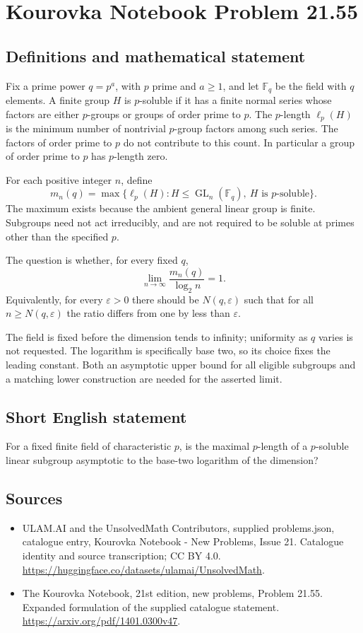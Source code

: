 \documentclass[11pt,a4paper]{article}
\begin{document}
\section*{Kourovka Notebook Problem 21.55}\label{statement}

\subsection{Definitions and mathematical statement}
Fix a prime power $q=p^a$, with $p$ prime and $a\ge1$, and let
$\mathbb F_q$ be the field with $q$ elements.
A finite group $H$ is $p$-soluble if it has a finite normal series
whose factors are either $p$-groups or groups of order prime to $p$.
The $p$-length $\ell_p(H)$ is the minimum number of nontrivial
$p$-group factors among such series. The factors of order prime to
$p$ do not contribute to this count. In particular a group of order
prime to $p$ has $p$-length zero.

For each positive integer $n$, define
\[
 m_n(q)=\max\{\ell_p(H):H\le\operatorname{GL}_n(\mathbb F_q),
                                      \ H\text{ is }p\text{-soluble}\}.
\]
The maximum exists because the ambient general linear group is finite.
Subgroups need not act irreducibly, and are not required to be soluble
at primes other than the specified $p$.

The question is whether, for every fixed $q$,
\[
 \lim_{n\to\infty}\frac{m_n(q)}{\log_2 n}=1.
\]
Equivalently, for every $\varepsilon>0$ there should be $N(q,\varepsilon)$
such that for all $n\ge N(q,\varepsilon)$ the ratio differs from one
by less than $\varepsilon$.

The field is fixed before the dimension tends to infinity; uniformity
as $q$ varies is not requested. The logarithm is specifically base two,
so its choice fixes the leading constant. Both an asymptotic upper
bound for all eligible subgroups and a matching lower construction
are needed for the asserted limit.
\subsection{Short English statement}
For a fixed finite field of characteristic $p$, is the maximal $p$-length of a $p$-soluble linear subgroup asymptotic to the base-two logarithm of the dimension?
\subsection{Sources}
\begin{itemize}
\item[S1] ULAM.AI and the UnsolvedMath Contributors, supplied problems.json, catalogue entry, Kourovka Notebook - New Problems, Issue 21. Catalogue identity and source transcription; CC BY 4.0.
\url{https://huggingface.co/datasets/ulamai/UnsolvedMath}.
\item[S2] The Kourovka Notebook, 21st edition, new problems, Problem 21.55. Expanded formulation of the supplied catalogue statement.
\url{https://arxiv.org/pdf/1401.0300v47}.
\end{itemize}
\end{document}
